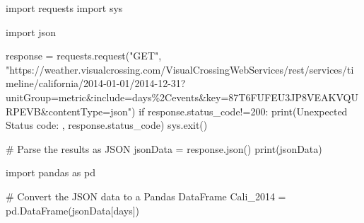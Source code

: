 \documentclass[
  letterpaper,
  DIV=11,
  numbers=noendperiod]{scrartcl}
\newenvironment{Shaded}{\begin{snugshade}}{\end{snugshade}}
\newcommand{\BuiltInTok}[1]{\textcolor[rgb]{0.00,0.23,0.31}{#1}}
\newcommand{\CommentTok}[1]{\textcolor[rgb]{0.37,0.37,0.37}{#1}}
\newcommand{\ControlFlowTok}[1]{\textcolor[rgb]{0.00,0.23,0.31}{#1}}
\newcommand{\DecValTok}[1]{\textcolor[rgb]{0.68,0.00,0.00}{#1}}
\newcommand{\ImportTok}[1]{\textcolor[rgb]{0.00,0.46,0.62}{#1}}
\newcommand{\NormalTok}[1]{\textcolor[rgb]{0.00,0.23,0.31}{#1}}
\newcommand{\OperatorTok}[1]{\textcolor[rgb]{0.37,0.37,0.37}{#1}}
\newcommand{\StringTok}[1]{\textcolor[rgb]{0.13,0.47,0.30}{#1}}
\begin{document}
\begin{Shaded}
\begin{Highlighting}[]
\ImportTok{import}\NormalTok{ requests}
\ImportTok{import}\NormalTok{ sys}

\ImportTok{import}\NormalTok{ json}
                

\NormalTok{response }\OperatorTok{=}\NormalTok{ requests.request(}\StringTok{"GET"}\NormalTok{, }\StringTok{"https://weather.visualcrossing.com/VisualCrossingWebServices/rest/services/timeline/california/2014{-}01{-}01/2014{-}12{-}31?unitGroup=metric\&include=days\%2Cevents\&key=87T6FUFEU3JP8VEAKVQURPEVB\&contentType=json"}\NormalTok{)}
\ControlFlowTok{if}\NormalTok{ response.status\_code}\OperatorTok{!=}\DecValTok{200}\NormalTok{:}
  \BuiltInTok{print}\NormalTok{(}\StringTok{\textquotesingle{}Unexpected Status code: \textquotesingle{}}\NormalTok{, response.status\_code)}
\NormalTok{  sys.exit()  }
\end{Highlighting}
\end{Shaded}

\begin{Shaded}
\begin{Highlighting}[]
\CommentTok{\# Parse the results as JSON}
\NormalTok{jsonData }\OperatorTok{=}\NormalTok{ response.json()}
\BuiltInTok{print}\NormalTok{(jsonData)}

\ImportTok{import}\NormalTok{ pandas }\ImportTok{as}\NormalTok{ pd}

\CommentTok{\# Convert the JSON data to a Pandas DataFrame}
\NormalTok{Cali\_2014 }\OperatorTok{=}\NormalTok{ pd.DataFrame(jsonData[}\StringTok{\textquotesingle{}days\textquotesingle{}}\NormalTok{])}
\end{Highlighting}
\end{Shaded}
\end{document}
